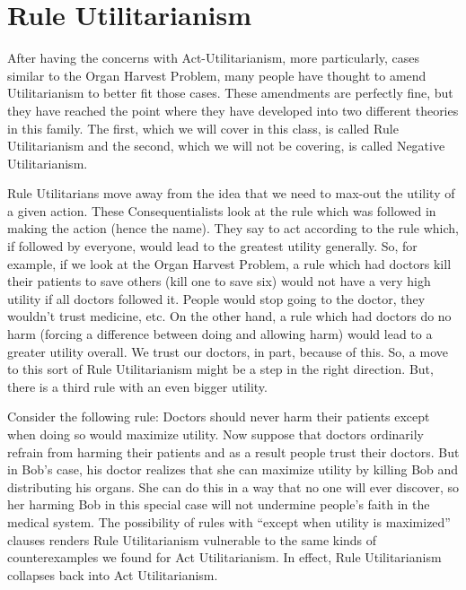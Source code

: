\section{Rule Utilitarianism}
After having the concerns with Act-Utilitarianism, more particularly, cases similar to the Organ Harvest Problem, many people have thought to amend Utilitarianism to better fit those cases. These amendments are perfectly fine, but they have reached the point where they have developed into two different theories in this family. The first, which we will cover in this class, is called Rule Utilitarianism and the second, which we will not be covering, is called Negative Utilitarianism.

Rule Utilitarians move away from the idea that we need to max-out the utility of a given action. These Consequentialists look at the rule which was followed in making the action (hence the name). They say to act according to the rule which, if followed by everyone, would lead to the greatest utility generally. So, for example, if we look at the Organ Harvest Problem, a rule which had doctors kill their patients to save others (kill one to save six) would not have a very high utility if all doctors followed it. People would stop going to the doctor, they wouldn't trust medicine, etc. On the other hand, a rule which had doctors do no harm (forcing a difference between doing and allowing harm) would lead to a greater utility overall. We trust our doctors, in part, because of this. So, a move to this sort of Rule Utilitarianism might be a step in the right direction. But, there is a third rule with an even bigger utility.

Consider the following rule: Doctors should never harm their patients except when doing so would maximize utility. Now suppose that doctors ordinarily refrain from harming their patients and as a result people trust their doctors. But in Bob’s case, his doctor realizes that she can maximize utility by killing Bob and distributing his organs. She can do this in a way that no one will ever discover, so her harming Bob in this special case will not undermine people’s faith in the medical system. The possibility of rules with “except when utility is maximized” clauses renders Rule Utilitarianism vulnerable to the same kinds of counterexamples we found for Act Utilitarianism. In effect, Rule Utilitarianism collapses back into Act Utilitarianism.

